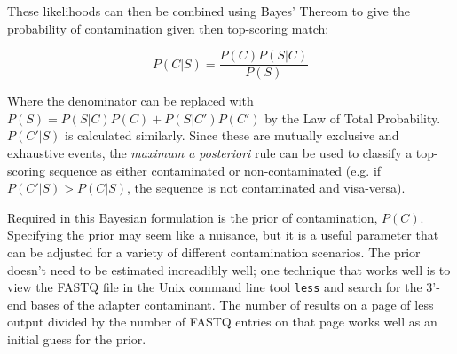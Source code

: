 \documentclass{bioinfo}
\begin{document}
\begin{methods}
These likelihoods can then be combined using Bayes' Thereom to give
the probability of contamination given then top-scoring match:

$$ P(C|S) = \frac{P(C) P(S|C)}{P(S)} $$

Where the denominator can be replaced with $P(S) = P(S | C)P(C) + P(S
| C') P(C')$ by the Law of Total Probability. $P(C'|S)$ is calculated
similarly. Since these are mutually exclusive and exhaustive events,
the \emph{maximum a posteriori} rule can be used to classify a
top-scoring sequence as either contaminated or non-contaminated
(e.g. if $P(C'|S) > P(C|S)$, the sequence is not contaminated and
visa-versa).

Required in this Bayesian formulation is the prior of contamination,
$P(C)$. Specifying the prior may seem like a nuisance, but it is a
useful parameter that can be adjusted for a variety of different
contamination scenarios. The prior doesn't need to be estimated
increadibly well; one technique that works well is to view the FASTQ
file in the Unix command line tool \texttt{less} and search for the
3'-end bases of the adapter contaminant. The number of results on a
page of less output divided by the number of FASTQ entries on that
page works well as an initial guess for the prior.



\end{methods}
\end{document}
